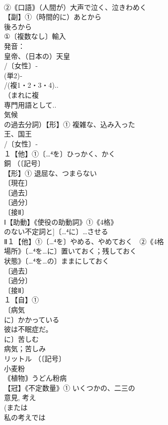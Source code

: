 \documentclass[8pt]{extreport}
\begin{document}
\begin{CJK}{UTF8}{min}
\\	②｟口語｠（人間が）大声で泣く、泣きわめく
\\	【副】①（時間的に）あとから
\\	後ろから
\\	①〔複数なし〕輸入 
\\	発音：
\\	皇帝、（日本の）天皇 
\\	/〔女性〕‐
\\	(単2)‐
\\	/(複1・2・3・4)..
\\	（まれに複
\\	専門用語として..
\\	気候 
\\	の過去分詞）【形】① 複雑な、込み入った
\\	王、国王 
\\	/〔女性〕‐
\\	１【他】①〔…⁴を〕ひっかく、かく 
\\	銅 （〔記号〕
\\	【形】① 退屈な、つまらない 
\\	〔現在〕
\\	〔過去〕
\\	〔過分〕
\\	〔接Ⅱ〕
\\	Ⅰ【助動】《使役の助動詞》①《4格》
\\	のない不定詞と]〔…⁴に〕…させる
\\	Ⅱ１【他】①〔…⁴を〕やめる、やめておく　②《4格
\\	場所》〔…⁴を…に〕置いておく；残しておく 
\\	状態》〔…⁴を…の〕ままにしておく
\\	〔過去〕
\\	〔過分〕
\\	〔接Ⅱ〕
\\	１【自】①
\\	〔病気
\\	に〕かかっている 
\\	彼は不眠症だ。 
\\	に〕苦しむ 
\\	病気；苦しみ
\\	リットル （〔記号〕
\\	小麦粉
\\	｟植物｠うどん粉病
\\	【冠】《不定数量》① いくつかの、二三の 
\\	意見, 考え 
\\	(または
\\	私の考えでは

\end{CJK}
\end{document}
